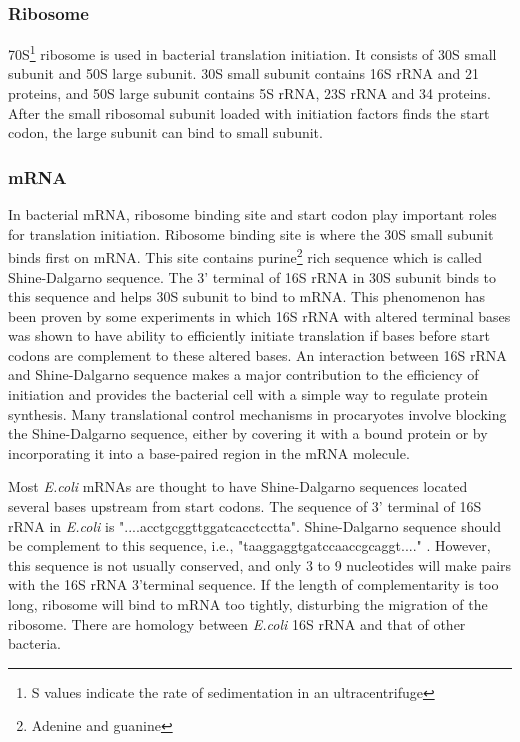 \subsubsection{Ribosome}

70S\footnote{S values indicate the rate of sedimentation in an
ultracentrifuge} ribosome is used in bacterial translation initiation.
It consists of 30S small subunit and 50S large subunit.  
30S small subunit contains 16S rRNA and 21 proteins, and 50S large
subunit contains 5S rRNA, 23S rRNA and 34 proteins.  After the
small ribosomal subunit loaded with initiation factors finds the start
codon, the large subunit can bind to small subunit.


\subsubsection{mRNA}

In bacterial mRNA, ribosome binding site and start codon play important
roles for translation initiation. Ribosome binding site is where the 30S
small subunit binds first on mRNA. This site contains
purine\footnote{Adenine and guanine} rich sequence which is called
Shine-Dalgarno sequence\cite{label7}. The 3' terminal of 16S rRNA in
30S subunit binds to this sequence and helps 30S subunit to bind to mRNA.
This phenomenon has been proven by some experiments in which 
16S rRNA with altered terminal bases was shown to have ability to
efficiently initiate translation if bases before start codons are
complement to these altered bases\cite{label7011}. An interaction between 16S rRNA and
Shine-Dalgarno sequence makes a major contribution to the efficiency of
initiation and provides the bacterial cell with a simple way to regulate
protein synthesis. Many translational control mechanisms in procaryotes
involve blocking the Shine-Dalgarno sequence, either by covering it with
a bound protein or by incorporating it into a base-paired region in the
mRNA molecule.

Most {\it E.coli} mRNAs are thought to have Shine-Dalgarno sequences
located several bases upstream from start codons.  The sequence of 3'
terminal of 16S rRNA in {\it E.coli} is
"....acctgcggttggatcacctcctta". Shine-Dalgarno sequence should be
complement to this sequence, i.e., "taaggaggtgatccaaccgcaggt...." .
However, this sequence is not usually conserved, and only 3 to 9
nucleotides will make pairs with the 16S rRNA 3'terminal sequence.  If
the length of complementarity is too long, ribosome will bind to mRNA
too tightly, disturbing the migration of the ribosome.  There are
homology between {\it E.coli} 16S rRNA and that of other bacteria.

